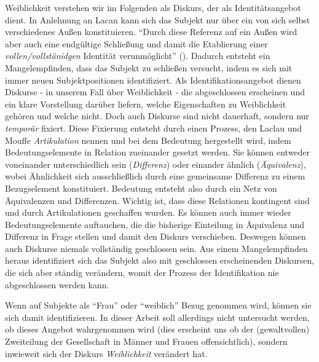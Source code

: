 \documentclass[12pt, titlepage=true, toc=bib]{scrartcl}
\begin{document}
Weiblichkeit verstehen wir im Folgenden als Diskurs, der als Identitätsangebot dient. In Anlehnung an Lacan kann sich das Subjekt nur über ein von sich selbst verschiedenes Außen konstituieren. "`Durch diese Referenz auf ein Außen wird aber auch eine endgültige Schließung und damit die Etablierung einer \textit{vollen/vollstänidgen} Identität verunmöglicht"' (\cite[199; Hervorh. im Orig.]{nonhoff_kollektive_2007}). Dadurch entsteht ein Mangelempfinden, dass das Subjekt zu schließen versucht, indem es sich mit immer neuen Subjektpositionen identifiziert. Als Identifikationsangebot dienen Diskurse - in unserem Fall über Weiblichkeit - die abgeschlossen erscheinen und ein klare Vorstellung darüber liefern, welche Eigenschaften zu Weiblichkeit gehören und welche nicht. Doch auch Diskurse sind nicht dauerhaft, sondern nur \textit{temporär} fixiert. Diese Fixierung entsteht durch einen Prozess, den Laclau und Mouffe \textit{Artikulation} nennen und bei dem Bedeutung hergestellt wird, indem Bedeutungselemente in Relation zueinander gesetzt werden. Sie können entweder voneinander unterschiedlich sein (\textit{Differenz}) oder einander ähnlich (\textit{Äquivalenz}), wobei Ähnlichkeit sich ausschließlich durch eine gemeinsame Differenz zu einem Bezugselement konstituiert. Bedeutung entsteht also durch ein Netz von Äquivalenzen und Differenzen. Wichtig ist, dass diese Relationen kontingent sind und durch Artikulationen geschaffen wurden. Es können auch immer wieder Bedeutungselemente auftauchen, die die bisherige Einteilung in Äquivalenz und Differenz in Frage stellen und damit den Diskurs verschieben. Deswegen können auch Diskurse niemals vollständig geschlossen sein. Aus einem Mangelempfinden heraus identifiziert sich das Subjekt also mit geschlossen erscheinenden Diskursen, die sich aber ständig verändern, womit der Prozess der Identifikation nie abgeschlossen werden kann.


Wenn auf Subjekte als "`Frau"' oder "`weiblich"' Bezug genommen wird, können sie sich damit identifizieren. In dieser Arbeit soll allerdings nicht untersucht werden, ob dieses Angebot wahrgenommen wird (dies erscheint uns ob der (gewaltvollen) Zweiteilung der Gesellschaft in Männer und Frauen offensichtlich), sondern inwieweit sich der Diskurs \textit{Weiblichkeit} verändert hat. 
\end{document}
